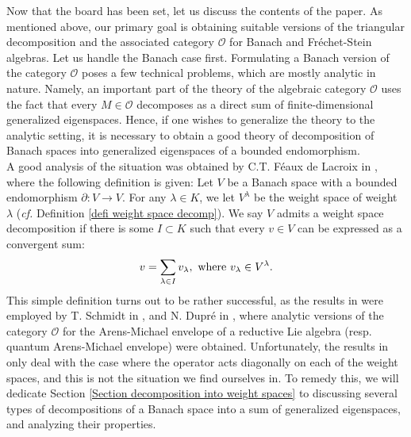 \documentclass{amsart}
\newcommand{\OX}{\mathcal{O}}
\begin{document}
Now that the board has been set, let us discuss the contents of the paper. As mentioned above, our primary goal is obtaining suitable versions of the triangular decomposition and the associated category $\OX$ for Banach and Fréchet-Stein algebras. Let us handle the Banach case first. Formulating a Banach version of the category $\OX$ poses a few technical problems, which are mostly analytic in nature. Namely, an important part of the theory of the algebraic category $\OX$ uses the fact that every $M\in \OX$ decomposes as a direct sum of finite-dimensional generalized eigenspaces. Hence, if one wishes to generalize the theory to the analytic setting, it is necessary to obtain a good theory of decomposition of Banach spaces into generalized eigenspaces of a bounded endomorphism.\\
A good analysis of the situation was obtained by C.T. Féaux de Lacroix in \cite{diagonFrechet modules}, where the following definition is given: Let $V$ be a Banach space with a bounded endomorphism $\partial:V\rightarrow V$. For any $\lambda \in K$, we let $V^{\lambda}$ be the weight space of weight $\lambda$  (\emph{cf.} Definition \ref{defi weight space decomp}). We say $V$ admits a weight space decomposition if there is some $I\subset K$ such that every $v\in V$ can be expressed as a convergent sum:
\begin{equation*}
    v=\sum_{\lambda \in I } v_{\lambda}, \textnormal{ where } v_{\lambda}\in V^{\lambda}.
\end{equation*}
This simple definition turns out to be rather successful, as the results in \cite{diagonFrechet modules} were employed  by T. Schmidt in \cite{Schmidt2010VermaMO}, and N. Dupré in \cite{Duprequantum}, where analytic versions of the category $\OX$ for the Arens-Michael envelope of a reductive Lie algebra (resp. quantum Arens-Michael envelope) were obtained. Unfortunately, the results in \cite{diagonFrechet modules} only deal with the case where the operator acts diagonally on each of the weight spaces, and this is not the situation we find ourselves in. To remedy this, we will dedicate Section \ref{Section decomposition into weight spaces} to discussing several types of decompositions of a Banach space into a sum of generalized eigenspaces, and analyzing their properties.\bigskip 
\end{document}
